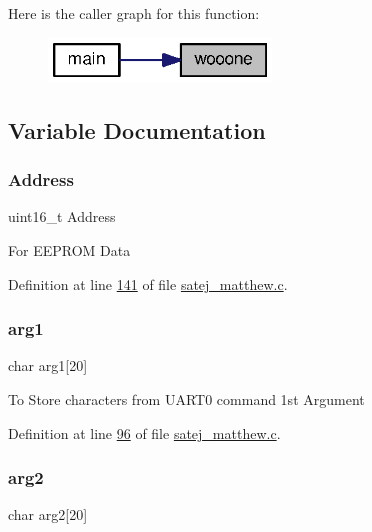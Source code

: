 Here is the caller graph for this function\+:\nopagebreak
\begin{figure}[H]
\begin{center}
\leavevmode
\includegraphics[width=168pt]{satej__matthew_8c_a35d3aeb4661540f67e367e4e328c6c88_icgraph}
\end{center}
\end{figure}


\subsection{Variable Documentation}
\mbox{\label{satej__matthew_8c_a749532d9fcee171290bbfbe7859e6ba7}} 
\subsubsection{\texorpdfstring{Address}{Address}}
{\footnotesize\ttfamily uint16\+\_\+t Address}

For E\+E\+P\+R\+OM Data 

Definition at line \mbox{\hyperlink{satej__matthew_8c_source_l00141}{141}} of file \mbox{\hyperlink{satej__matthew_8c_source}{satej\+\_\+matthew.\+c}}.

\mbox{\label{satej__matthew_8c_accf689945fb0ed6303f1696f1171a053}} 
\subsubsection{\texorpdfstring{arg1}{arg1}}
{\footnotesize\ttfamily char arg1\mbox{[}20\mbox{]}}

To Store characters from U\+A\+R\+T0 command 1st Argument 

Definition at line \mbox{\hyperlink{satej__matthew_8c_source_l00096}{96}} of file \mbox{\hyperlink{satej__matthew_8c_source}{satej\+\_\+matthew.\+c}}.

\mbox{\label{satej__matthew_8c_a31707e8b8c984ef710bfa2b7f63b0760}} 
\subsubsection{\texorpdfstring{arg2}{arg2}}
{\footnotesize\ttfamily char arg2\mbox{[}20\mbox{]}}

